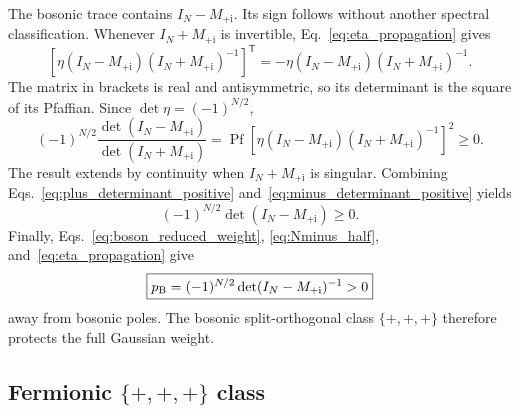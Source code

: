 \documentclass[onecolumn,aps,prb,amsmath,amssymb,superscriptaddress,longbibliography]{revtex4-2}
\newcommand{\ii}{\mathrm{i}}
\newcommand{\trans}{\mathsf{T}}
\begin{document}
The bosonic trace contains \(I_N-M_{+\ii}\).  Its sign follows without another spectral classification.  Whenever \(I_N+M_{+\ii}\) is invertible, Eq.~\eqref{eq:eta_propagation} gives
\begin{equation}
    \left[\eta(I_N-M_{+\ii})(I_N+M_{+\ii})^{-1}\right]^\trans
    =-\eta(I_N-M_{+\ii})(I_N+M_{+\ii})^{-1}.
    \label{eq:cayley_antisymmetric}
\end{equation}
The matrix in brackets is real and antisymmetric, so its determinant is the square of its Pfaffian.  Since \(\det\eta=(-1)^{N/2}\),
\begin{equation}
    (-1)^{N/2}
    \frac{\det(I_N-M_{+\ii})}{\det(I_N+M_{+\ii})}
    =\operatorname{Pf}\!\left[
      \eta(I_N-M_{+\ii})(I_N+M_{+\ii})^{-1}
    \right]^2\geq0.
    \label{eq:minus_determinant_positive}
\end{equation}
The result extends by continuity when \(I_N+M_{+\ii}\) is singular.  Combining Eqs.~\eqref{eq:plus_determinant_positive} and~\eqref{eq:minus_determinant_positive} yields
\begin{equation}
    (-1)^{N/2}\det(I_N-M_{+\ii})\geq0.
    \label{eq:boson_three_plus_det_sign}
\end{equation}
Finally, Eqs.~\eqref{eq:boson_reduced_weight}, \eqref{eq:Nminus_half}, and~\eqref{eq:eta_propagation} give
\begin{equation}
    \boxed{
    p_{\rm B}=(-1)^{N/2}\det(I_N-M_{+\ii})^{-1}>0
    }
    \label{eq:boson_three_plus_weight}
\end{equation}
away from bosonic poles.  The bosonic split-orthogonal class \(\{+,+,+\}\) therefore protects the full Gaussian weight.

\subsection{Fermionic \texorpdfstring{\(\{+,+,+\}\)}{\{+,+,+\}} class}
\end{document}
